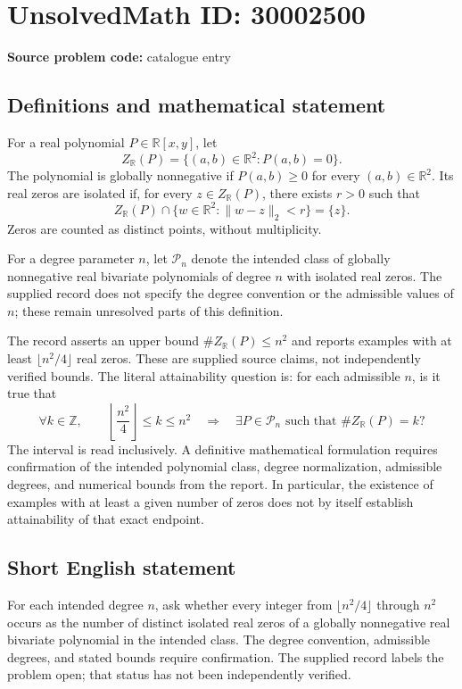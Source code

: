 \documentclass[11pt]{article}
\newcommand{\Z}{\mathbb{Z}}
\newcommand{\R}{\mathbb{R}}
\begin{document}
\section*{UnsolvedMath ID: 30002500}
\textbf{Source problem code:} catalogue entry
\subsection{Definitions and mathematical statement}
For a real polynomial \(P\in\R[x,y]\), let
\[
Z_{\R}(P)=\{(a,b)\in\R^2:P(a,b)=0\}.
\]
The polynomial is globally nonnegative if \(P(a,b)\geq0\) for every \((a,b)\in\R^2\). Its real zeros are isolated if, for every \(z\in Z_{\R}(P)\), there exists \(r>0\) such that
\[
Z_{\R}(P)\cap\{w\in\R^2:\|w-z\|_2<r\}=\{z\}.
\]
Zeros are counted as distinct points, without multiplicity.

For a degree parameter \(n\), let \(\mathcal P_n\) denote the intended class of globally nonnegative real bivariate polynomials of degree \(n\) with isolated real zeros. The supplied record does not specify the degree convention or the admissible values of \(n\); these remain unresolved parts of this definition.

The record asserts an upper bound \(\#Z_{\R}(P)\leq n^2\) and reports examples with at least \(\lfloor n^2/4\rfloor\) real zeros. These are supplied source claims, not independently verified bounds. The literal attainability question is: for each admissible \(n\), is it true that
\[
\forall k\in\Z,\qquad
\left\lfloor\frac{n^2}{4}\right\rfloor\leq k\leq n^2
\quad\Longrightarrow\quad
\exists P\in\mathcal P_n\text{ such that }\#Z_{\R}(P)=k?
\]
The interval is read inclusively. A definitive mathematical formulation requires confirmation of the intended polynomial class, degree normalization, admissible degrees, and numerical bounds from the report. In particular, the existence of examples with at least a given number of zeros does not by itself establish attainability of that exact endpoint.
\subsection{Short English statement}
For each intended degree \(n\), ask whether every integer from \(\lfloor n^2/4\rfloor\) through \(n^2\) occurs as the number of distinct isolated real zeros of a globally nonnegative real bivariate polynomial in the intended class. The degree convention, admissible degrees, and stated bounds require confirmation. The supplied record labels the problem open; that status has not been independently verified.
\end{document}
